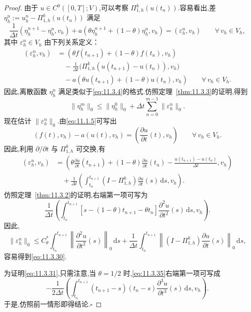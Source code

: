 \begin{proof}
由于 \(u\in C^0([0,T];V)\),可以考察 \(\Pi_{1,h}^k(u(t_n))\).容易看出,差 \(\eta_h^n:=u_h^n-\Pi_{1,h}^k(u(t_n))\) 满足
\begin{equation}\label{eq:11.3.32}
  \frac1{\Delta t}(\eta_h^{n+1}-\eta_h^n,v_h)
    +a(\theta\eta_h^{n+1}+(1-\theta)\eta_h^n,v_h)
      =(\varepsilon_h^n,v_h)\qquad\forall\,v_h\in V_h,
\end{equation}
其中 \(\varepsilon_h^n\in V_h\) 由下列关系定义：
\begin{equation}\label{eq:11.3.33}
  \begin{aligned}
    (\varepsilon_h^n,v_h)
      &=(\theta f(t_{n+1})+(1-\theta)f(t_n),v_h)\\
      &\quad-\frac1{\Delta t}\bigl(\Pi_{1,h}^k(u(t_{n+1})-u(t_n)),v_h\bigr)\\
      &\quad-a(\theta u(t_{n+1})+(1-\theta)u(t_n),v_h)
                \qquad\forall\,v_h\in V_h .
  \end{aligned}
\end{equation}
因此,离散函数 \(\eta_h^n\) 满足类似于\eqref{eq:11.3.4}的格式.仿照定理~\ref{thm:11.3.3}的证明,得到
\begin{equation}\label{eq:11.3.34}
  \|\eta_h^m\|_0\le\|\eta_h^0\|_0+\Delta t\sum_{n=0}^{m-1}\|\varepsilon_h^n\|_0.
\end{equation}
现在估计 \(\|\varepsilon_h^n\|_0\).由\eqref{eq:11.1.5}可写出
\[
  (f(t),v_h)-a(u(t),v_h)=\left(\frac{\partial u}{\partial t}(t),v_h\right)
        \qquad\forall\,v_h\in V_h.
\]
因此,利用 \(\partial/\partial t\) 与 \(\Pi_{1,h}^k\) 可交换,有
\begin{equation}\label{eq:11.3.35}
  \begin{aligned}
    (\varepsilon_h^n,v_h)
      &=\left(\theta\frac{\partial u}{\partial t}(t_{n+1})
           +(1-\theta)\frac{\partial u}{\partial t}(t_n)
           -\frac{u(t_{n+1})-u(t_n)}{\Delta t},v_h\right)\\
      &\quad+\frac1{\Delta t}\left(\int_{t_n}^{t_{n+1}}
            (I-\Pi_{1,h}^k)\frac{\partial u}{\partial t}(s)\,\mathrm ds,v_h\right).
  \end{aligned}
\end{equation}
仿照定理~\ref{thm:11.3.2}的证明,右端第一项可写为
\[
  \frac1{\Delta t}\left(
    \int_{t_n}^{t_{n+1}}[s-(1-\theta)t_{n+1}-\theta t_n]
                       \frac{\partial^2u}{\partial t^2}(s)\,\mathrm ds,v_h\right).
\]
因此,
\[
  \|\varepsilon_h^n\|_0
     \le C_\theta^*\int_{t_n}^{t_{n+1}}\left\|\frac{\partial^2u}{\partial t^2}(s)\right\|_0\,\mathrm ds
        +\frac1{\Delta t}\int_{t_n}^{t_{n+1}}
             \left\|(I-\Pi_{1,h}^k)\frac{\partial u}{\partial t}(s)\right\|_0\,\mathrm ds,
\]
容易得到\eqref{eq:11.3.30}.

为证明\eqref{eq:11.3.31},只需注意,当 \(\theta=1/2\) 时,\eqref{eq:11.3.35}右端第一项可写成
\[
  -\frac1{2\Delta t}\left(\int_{t_n}^{t_{n+1}}(t_{n+1}-s)(t_n-s)
            \frac{\partial^3u}{\partial t^3}(s)\,\mathrm ds,v_h\right).
\]
于是,仿照前一情形即得结论.\hfill\(\square\)
\end{proof}


